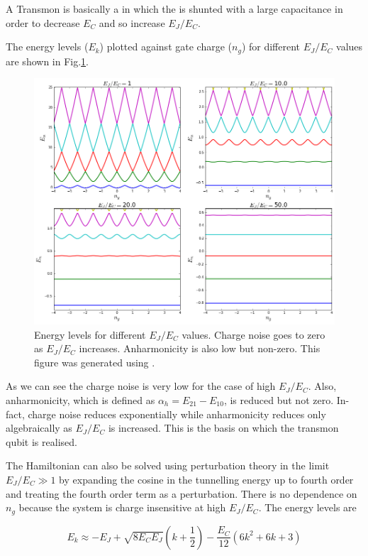 A Transmon is basically a \CPB in which the \JJ is shunted with a large capacitance in order to decrease $E_C$ and so increase $E_J/E_C$.

The energy levels ($E_k$) plotted against gate charge ($n_g$) for different $E_J/E_C$ values are shown in Fig.\ref{fig:diff EJ/EC}.

\begin{figure}
\centering
\includegraphics[width=\linewidth]{Figures/EjEcall.png}
\decoRule
\caption[Different $E_J/E_C$]{Energy levels for different $E_J/E_C$ values. Charge noise goes to zero as $E_J/E_C$ increases. Anharmonicity is also low but non-zero. This figure was generated using \cite{Johansson2012}.}
\label{fig:diff EJ/EC}
\end{figure}

As we can see the charge noise is very low for the case of high $E_J/E_C$. Also, anharmonicity, which is defined as $\alpha_h=E_{21}-E_{10}$, is reduced but not zero. In-fact, charge noise reduces exponentially while anharmonicity reduces only algebraically as $E_J/E_C$ is increased. This is the basis on which the transmon qubit is realised.

The Hamiltonian can also be solved using perturbation theory in the limit $E_J/E_C\gg 1$ by expanding the cosine in the tunnelling energy up to fourth order and treating the fourth order term as a perturbation. There is no dependence on $n_g$ because the system is charge insensitive at high $E_J/E_C$. The energy levels are \cite{Koch2007a}

\begin{equation}
E_k\approx-E_J+\sqrt{8E_CE_J}\left(k+\frac{1}{2}\right)-\frac{E_C}{12}(6k^2+6k+3)
\label{eqn:transmon levels}
\end{equation}

